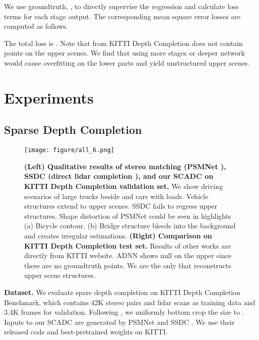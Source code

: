\documentclass{article}
\begin{document}
We use groundtruth, , to directly supervise the regression and calculate loss terms for each stage output. The corresponding mean square error losses are computed as follows.

The total loss is . Note that  from KITTI Depth Completion does not contain points on the upper scenes. We find that using more stages or deeper network would cause overfitting on the lower parts and yield unstructured upper scenes.

\section{Experiments}

\vspace{-5pt}
\subsection{Sparse Depth Completion}
\vspace{-5pt}
\begin{figure*}[hbt!]
    \centering
    \texttt{[image: figure/all\_6.png]}
    \vspace{-20pt}
    \caption{\textbf{(Left) Qualitative results of stereo matching (PSMNet \cite{chang2018pyramid}), SSDC (direct lidar completion \cite{ma2019self}), and our SCADC on KITTI Depth Completion validation set.} We show driving scenarios of large trucks beside and cars with loads. Vehicle structures extend to upper scenes. SSDC fails to regress upper structures. Shape distortion of PSMNet could be seen in highlights (a) Bicycle contour. (b) Bridge structure bleeds into the background and creates irregular estimations. \textbf{(Right) Comparison on KITTI Depth Completion test set.} Results of other works are directly from KITTI website. ADNN \cite{chodosh18} shows null on the upper since there are no groundtruth points. We are the only that reconstructs upper scene structures.}
    \label{all}
    \vspace{-12pt}
\end{figure*}

\textbf{Dataset.} We evaluate spare depth completion on KITTI Depth Completion Benchmark, which contains 42K stereo pairs and lidar scans as training data and 3.4K frames for validation. Following \cite{ma2019self}, we uniformly bottom crop the size to . Inputs to our SCADC are generated by PSMNet \cite{chang2018pyramid} and SSDC \cite{ma2019self}. We use their released code and best-pretrained weights on KITTI.
\end{document}
